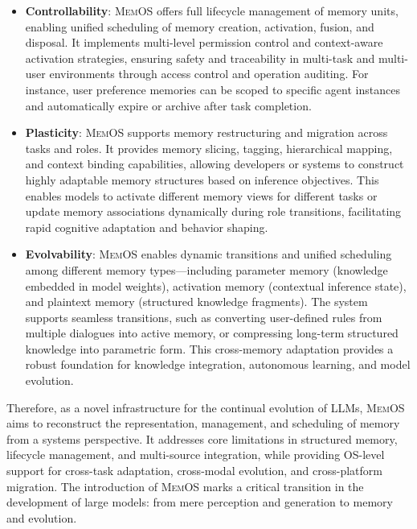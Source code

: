 \documentclass[]{memtensor}
\begin{document}
\begin{itemize}

    \item \textbf{Controllability}: \textsc{MemOS} offers full lifecycle management of memory units, enabling unified scheduling of memory creation, activation, fusion, and disposal. It implements multi-level permission control and context-aware activation strategies, ensuring safety and traceability in multi-task and multi-user environments through access control and operation auditing. For instance, user preference memories can be scoped to specific agent instances and automatically expire or archive after task completion.

    \item \textbf{Plasticity}: \textsc{MemOS} supports memory restructuring and migration across tasks and roles. It provides memory slicing, tagging, hierarchical mapping, and context binding capabilities, allowing developers or systems to construct highly adaptable memory structures based on inference objectives. This enables models to activate different memory views for different tasks or update memory associations dynamically during role transitions, facilitating rapid cognitive adaptation and behavior shaping.

    \item \textbf{Evolvability}: \textsc{MemOS} enables dynamic transitions and unified scheduling among different memory types—including parameter memory (knowledge embedded in model weights), activation memory (contextual inference state), and plaintext memory (structured knowledge fragments). The system supports seamless transitions, such as converting user-defined rules from multiple dialogues into active memory, or compressing long-term structured knowledge into parametric form. This cross-memory adaptation provides a robust foundation for knowledge integration, autonomous learning, and model evolution.

\end{itemize}

Therefore, as a novel infrastructure for the continual evolution of LLMs, \textsc{MemOS} aims to reconstruct the representation, management, and scheduling of memory from a systems perspective. It addresses core limitations in structured memory, lifecycle management, and multi-source integration, while providing OS-level support for cross-task adaptation, cross-modal evolution, and cross-platform migration.
The introduction of \textsc{MemOS} marks a critical transition in the development of large models: from mere perception and generation to memory and evolution.
\end{document}
